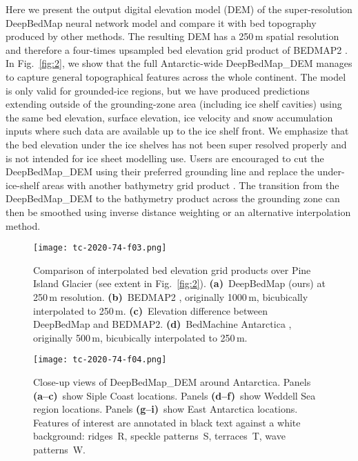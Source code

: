 \documentclass[tc, noline]{copernicus}
\begin{document}
Here we present the output digital elevation model (DEM) of the super-resolution DeepBedMap neural network model and compare it with bed topography
produced by other methods. The resulting DEM has a 250\,\unit{m} spatial resolution and therefore a four-times upsampled bed elevation grid product of
BEDMAP2 \citep{FretwellBedmap2improvedice2013}. In Fig.~\ref{fig:2}, we show that the full Antarctic-wide DeepBedMap\_DEM manages to capture general
topographical features across the whole continent. The model is only valid for grounded-ice regions, but we have produced predictions extending
outside of the grounding-zone area (including ice shelf cavities) using the same bed elevation, surface elevation, ice velocity and snow accumulation
inputs where such data are available up to the ice shelf front. We emphasize that the bed elevation under the ice shelves has not been super resolved
properly and is not intended for ice sheet modelling use. Users are encouraged to cut the DeepBedMap\_DEM using their preferred grounding line
\citep[e.g.][]{BindschadlerGettingAntarcticanew2011,RignotAntarcticgroundingline2011,MouginotMEaSURESAntarcticBoundaries2017} and replace the under-ice-shelf areas with another bathymetry grid product \citep[e.g.][]{GEBCOCompilationGroupGEBCO2020Grid2020}. The transition from the DeepBedMap\_DEM
to the bathymetry product across the grounding zone can then be smoothed using inverse distance weighting or an alternative interpolation method.

\begin{figure*}[t]
\texttt{[image: tc-2020-74-f03.png]}
\caption{Comparison of interpolated bed elevation grid products over Pine Island Glacier (see extent in Fig.~\ref{fig:2}). \textbf{(a)}~DeepBedMap (ours) at 250\,\unit{m} resolution. \textbf{(b)}~BEDMAP2 \citep{FretwellBedmap2improvedice2013}, originally 1000\,\unit{m}, bicubically interpolated to 250\,\unit{m}. \textbf{(c)}~Elevation difference between DeepBedMap and BEDMAP2. \textbf{(d)}~BedMachine Antarctica \citep{MorlighemMEaSUREsBedMachineAntarctica2019}, originally 500\,\unit{m}, bicubically interpolated to 250\,\unit{m}.}
\label{fig:3}
\end{figure*}

\begin{figure*}[t]
\texttt{[image: tc-2020-74-f04.png]}
\caption{Close-up views of DeepBedMap\_DEM around Antarctica. Panels \textbf{(a--c)}~show Siple Coast locations. Panels \textbf{(d--f)}~show Weddell Sea region locations. Panels \textbf{(g--i)}~show East Antarctica locations. Features of interest are annotated in black text against a white background: ridges~R, speckle patterns~S, terraces~T, wave patterns~W.}
\label{fig:4}
\end{figure*}
\end{document}
